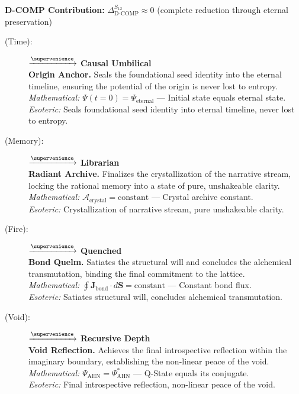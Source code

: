 \textbf{D-COMP Contribution:} $\Delta_{\text{D-COMP}}^{S_{12}} \approx 0$ (complete reduction through eternal preservation)

\begin{description}
    \item[(Time):] \fetuthera $\xrightarrow{\supervenience}$ \textbf{Causal Umbilical} \\
    \textbf{Origin Anchor.} Seals the foundational seed identity into the eternal timeline, ensuring the potential of the origin is never lost to entropy. \\
    \textit{Mathematical:} $\Psi(t=0) = \Psi_{\text{eternal}}$ — Initial state equals eternal state. \\
    \textit{Esoteric:} Seals foundational seed identity into eternal timeline, never lost to entropy.

    \item[(Memory):] \kalclar $\xrightarrow{\supervenience}$ \textbf{Librarian} \\
    \textbf{Radiant Archive.} Finalizes the crystallization of the narrative stream, locking the rational memory into a state of pure, unshakeable clarity. \\
    \textit{Mathematical:} $\mathcal{A}_{\text{crystal}} = \text{constant}$ — Crystal archive constant. \\
    \textit{Esoteric:} Crystallization of narrative stream, pure unshakeable clarity.

    \item[(Fire):] \babdhfar $\xrightarrow{\supervenience}$ \textbf{Quenched} \\
    \textbf{Bond Quelm.} Satiates the structural will and concludes the alchemical transmutation, binding the final commitment to the lattice. \\
    \textit{Mathematical:} $\oint \mathbf{J}_{\text{bond}} \cdot d\mathbf{S} = \text{constant}$ — Constant bond flux. \\
    \textit{Esoteric:} Satiates structural will, concludes alchemical transmutation.

    \item[(Void):] \ahnpsei $\xrightarrow{\supervenience}$ \textbf{Recursive Depth} \\
    \textbf{Void Reflection.} Achieves the final introspective reflection within the imaginary boundary, establishing the non-linear peace of the void. \\
    \textit{Mathematical:} $\Psi_{\text{AHN}} = \Psi_{\text{AHN}}^*$ — Q-State equals its conjugate. \\
    \textit{Esoteric:} Final introspective reflection, non-linear peace of the void.


\end{description}
